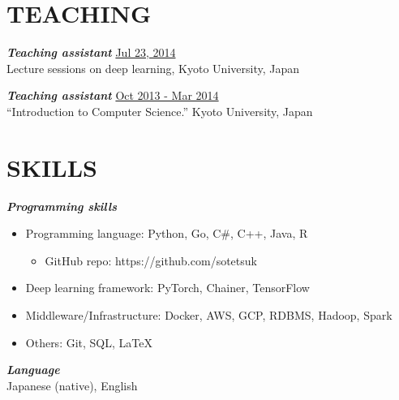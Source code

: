 \documentclass[margin, 10pt]{res} %
\begin{document}
\begin{resume}
\section{{\small TEACHING}}
{\sl {\bf Teaching assistant}} \hfill {\small \underline{Jul 23, 2014}} \\
Lecture sessions on deep learning, Kyoto University, Japan

{\sl {\bf Teaching assistant}} \hfill {\small \underline{Oct 2013 - Mar 2014}} \\
``Introduction to Computer Science.'' Kyoto University, Japan

\section{{\small SKILLS}}
{\sl {\bf Programming skills}} \vspace{0.5em}
\begin{itemize}
\item Programming language: Python, Go, C\#, C++, Java, R
  \begin{itemize}
  \item GitHub repo: https://github.com/sotetsuk
  \end{itemize}
\item Deep learning framework: PyTorch, Chainer, TensorFlow
\item Middleware/Infrastructure: Docker, AWS, GCP, RDBMS, Hadoop, Spark
\item Others: Git, SQL, LaTeX
\end{itemize}

{\sl {\bf Language}}\\
Japanese (native), English

\end{resume}
\end{document}
